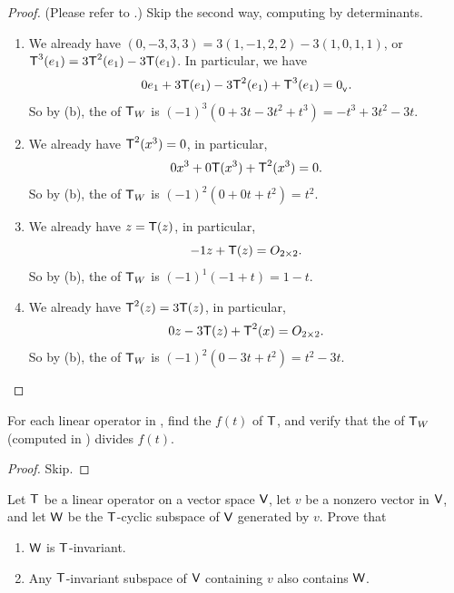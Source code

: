 \begin{proof}
(Please refer to .)
Skip the second way, computing by determinants.
\begin{enumerate}
\item We already have \((0, -3, 3, 3) = 3(1, -1, 2, 2) - 3(1, 0, 1, 1)\), or \(\textsf{T}^3(e_1) = 3\textsf{T}^2(e_1) - 3\textsf{T}(e_1)\).
In particular, we have
\[
    0 e_1 + 3\textsf{T}(e_1) - 3\textsf{T}^2(e_1) + \textsf{T}^3(e_1) = 0_{_{\textsf{V}}}.
\]
So by (b), the \CPOLY{} of \(\textsf{T}_W\) is \((-1)^3(0 + 3t - 3t^2 + t^3) = -t^3 + 3t^2 - 3t\).

\item We already have \(\textsf{T}^2(x^3) = 0\), in particular,
\[
    0 x^3 + 0 \textsf{T}(x^3) + \textsf{T}^2(x^3) = 0.
\]
So by (b), the \CPOLY{} of \(\textsf{T}_W\) is \((-1)^2(0 + 0t + t^2) = t^2\).

\item We already have \(z = \textsf{T}(z)\), in particular,
\[
    -1 z + \textsf{T}(z) = O_{2 \times 2}.
\]
So by (b), the \CPOLY{} of \(\textsf{T}_W\) is \((-1)^1(-1 + t) = 1 - t\).

\item We already have \(\textsf{T}^2(z) = 3\textsf{T}(z)\), in particular,
\[
    0 z - 3\textsf{T}(z) + \textsf{T}^2(x) = O_{2 \times 2}.
\]
So by (b), the \CPOLY{} of \(\textsf{T}_W\) is \((-1)^2(0 - 3t + t^2) = t^2 - 3t\).
\end{enumerate}
\end{proof}

\begin{exercise} \label{exercise 5.4.10}
For each linear operator in , find the \CPOLY{} \(f(t)\) of \(\textsf{T}\), and verify that the \CPOLY{} of \(\textsf{T}_W\) (computed in ) divides \(f(t)\).
\end{exercise}

\begin{proof}
Skip.
\end{proof}

\begin{exercise} \label{exercise 5.4.11}
Let \(\textsf{T}\) be a linear operator on a vector space \(\textsf{V}\), let \(v\) be a nonzero vector in \(\textsf{V}\), and let \(\textsf{W}\) be the \(\textsf{T}\)-cyclic subspace of \(\textsf{V}\) generated by \(v\).
Prove that
\begin{enumerate}
\item \(\textsf{W}\) is \(\textsf{T}\)-invariant.
\item Any \(\textsf{T}\)-invariant subspace of \(\textsf{V}\) containing \(v\) also contains \(\textsf{W}\).
\end{enumerate}
\end{exercise}

